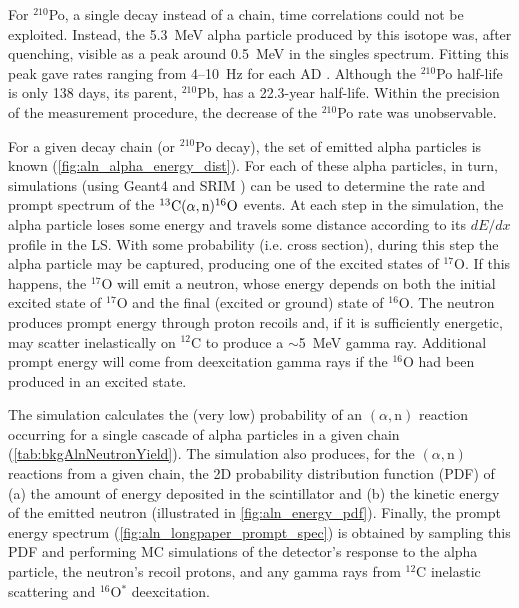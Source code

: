 \documentclass[../thesis.tex]{subfiles}
\begin{document}
For $^{210}$Po, a single decay instead of a chain, time correlations could not be exploited. Instead, the 5.3~MeV alpha particle produced by this isotope was, after quenching, visible as a peak around 0.5~MeV in the singles spectrum. Fitting this peak gave rates ranging from 4--10~Hz for each AD \cite{zeyuanAln}. Although the $^{210}$Po half-life is only 138 days, its parent, $^{210}$Pb, has a 22.3-year half-life. Within the precision of the measurement procedure, the decrease of the $^{210}$Po rate was unobservable.

For a given decay chain (or $^{210}$Po decay), the set of emitted alpha particles is known (\autoref{fig:aln_alpha_energy_dist}). For each of these alpha particles, in turn, simulations (using Geant4 \cite{Geant4} and SRIM \cite{SRIM}) can be used to determine the rate and prompt spectrum of the $^{13}\mathrm{C}(\alpha, \mathrm{n})^{16}\mathrm{O}$ events. At each step in the simulation, the alpha particle loses some energy and travels some distance according to its $dE/dx$ profile in the LS. With some probability (i.e. cross section), during this step the alpha particle may be captured, producing one of the excited states of $^{17}$O. If this happens, the $^{17}$O will emit a neutron, whose energy depends on both the initial excited state of $^{17}$O and the final (excited or ground) state of $^{16}$O. The neutron produces prompt energy through proton recoils and, if it is sufficiently energetic, may scatter inelastically on $^{12}$C to produce a $\sim$5~MeV gamma ray. Additional prompt energy will come from deexcitation gamma rays if the $^{16}$O had been produced in an excited state.

The simulation calculates the (very low) probability of an $(\alpha,\mathrm{n})$ reaction occurring for a single cascade of alpha particles in a given chain (\autoref{tab:bkgAlnNeutronYield}). The simulation also produces, for the $(\alpha,\mathrm{n})$ reactions from a given chain, the 2D probability distribution function (PDF) of (a) the amount of energy deposited in the scintillator and (b) the kinetic energy of the emitted neutron (illustrated in \autoref{fig:aln_energy_pdf}). Finally, the prompt energy spectrum (\autoref{fig:aln_longpaper_prompt_spec}) is obtained by sampling this PDF and performing MC simulations of the detector's response to the alpha particle, the neutron's recoil protons, and any gamma rays from $^{12}$C inelastic scattering and $^{16}$O$^*$ deexcitation.
\end{document}
